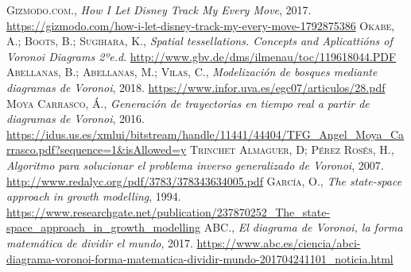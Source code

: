\documentclass[12pt]{article}
\begin{document}

\clearpage
\begin{thebibliography}{9}
 \textsc{Gizmodo.com.}, \textit{How I Let Disney Track My Every Move}, 2017. \textcolor{blue}{\url{https://gizmodo.com/how-i-let-disney-track-my-every-move-1792875386}}	
 \textsc{Okabe, A.}; \textsc{Boots, B.}; \textsc{Sugihara, K.}, \textit{Spatial tessellations. Concepts and Aplicattións of Voronoi Diagrams 2ºe.d}. \textcolor{blue}{\url{http://www.gbv.de/dms/ilmenau/toc/119618044.PDF}}
 \textsc{Abellanas, B.}; \textsc{Abellanas, M.}; \textsc{Vilas, C.}, \textit{Modelización de bosques mediante diagramas de Voronoi}, 2018. \textcolor{blue}{\url{https://www.infor.uva.es/egc07/articulos/28.pdf}}
 \textsc{Moya Carrasco, Á.}, \textit{Generación de trayectorias en tiempo real a partir de diagramas de Voronoi}, 2016. \textcolor{blue}{\url{https://idus.us.es/xmlui/bitstream/handle/11441/44404/TFG_Angel_Moya_Carrasco.pdf?sequence=1&isAllowed=y}}
 \textsc{Trinchet Almaguer, D}; \textsc{Pérez Rosés, H.}, \textit{Algoritmo para solucionar el problema inverso generalizado de Voronoi}, 2007. \textcolor{blue}{\url{http://www.redalyc.org/pdf/3783/378343634005.pdf}}
 \textsc{García, O.}, \textit{The state-space approach in growth modelling}, 1994. \textcolor{blue}{\url{https://www.researchgate.net/publication/237870252_The_state-space_approach_in_growth_modelling}}
 \textsc{ABC.}, \textit{El diagrama de Voronoi, la forma matemática de dividir el mundo}, 2017. \textcolor{blue}{\url{https://www.abc.es/ciencia/abci-diagrama-voronoi-forma-matematica-dividir-mundo-201704241101_noticia.html}}
\end{thebibliography}
\end{document}
